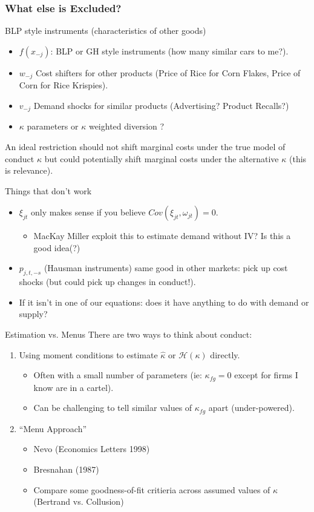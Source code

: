 \documentclass[xcolor=pdftex,dvipsnames,table,mathserif,aspectratio=169]{beamer}
\begin{document}
\begin{frame}
\frametitle{What else is Excluded?}
BLP style instruments (characteristics of other goods)
\begin{itemize}
\item $f(x_{-j})$: BLP or GH style instruments (how many similar cars to me?).
\item $w_{-j}$ Cost shifters for other products (Price of Rice for Corn Flakes, Price of Corn for Rice Krispies).
\item $v_{-j}$ Demand shocks for similar products (Advertising? Product Recalls?)
\item $\kappa$ parameters or $\kappa$ weighted diversion ?
\end{itemize}
An ideal restriction should \alert{not} shift marginal costs under the true model of conduct $\kappa$ but could potentially shift marginal costs under the alternative $\kappa$ (this is relevance).
\end{frame}


\begin{frame}{Things that don't work}
\begin{itemize}
\item $\xi_{jt}$ only makes sense if you believe $Cov(\xi_{jt},\omega_{jt})=0$.
\begin{itemize}
  \item MacKay Miller exploit this to estimate demand without IV? Is this a good idea(?)
\end{itemize}
\item $p_{j,t,-s}$ (Hausman instruments) same good in other markets: pick up cost shocks (but could pick up changes in conduct!). 
\item If it isn't in one of our equations: does it have anything to do with demand or supply?
\end{itemize}
\end{frame}


\begin{frame}{Estimation vs. Menus}
There are two ways to think about conduct:
\begin{enumerate}
\item Using moment conditions to estimate $\widehat{\kappa}$ or $\mathcal{H}(\kappa)$ directly.
\begin{itemize}
\item Often with a small number of parameters (ie: $\kappa_{fg}=0$ except for firms I know are in a cartel).
\item Can be challenging to tell similar values of $\kappa_{fg}$ apart (under-powered).
\end{itemize}
\item ``Menu Approach''
\begin{itemize}
\item  Nevo (Economics Letters 1998)
\item Bresnahan (1987)
\item Compare some goodness-of-fit critieria across assumed values of $\kappa$ (Bertrand vs. Collusion)
  \end{itemize}
  \end{enumerate}
\end{frame}
\end{document}
